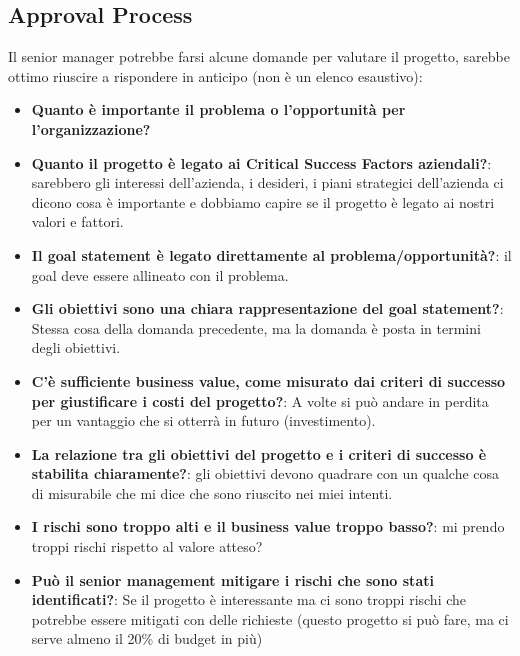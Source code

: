\subsection{Approval Process}
Il senior manager potrebbe farsi alcune domande per valutare il progetto, sarebbe ottimo riuscire a rispondere in anticipo (non è un elenco esaustivo):
\begin{itemize}
	\item \textbf{Quanto è importante il problema o l'opportunità per l'organizzazione?}
	\item \textbf{Quanto il progetto è legato ai Critical Success Factors aziendali?}: sarebbero gli interessi dell'azienda, i desideri, i piani strategici dell'azienda ci dicono cosa è importante e dobbiamo capire se il progetto è legato ai nostri valori e fattori.
	\item \textbf{Il goal statement è legato direttamente al problema/opportunità?}: il goal deve essere allineato con il problema.
	\item \textbf{Gli obiettivi sono una chiara rappresentazione del goal statement?}: Stessa cosa della domanda precedente, ma la domanda è posta in termini degli obiettivi.
	\item \textbf{C'è sufficiente business value, come misurato dai criteri di successo per giustificare i costi del progetto?}: A volte si può andare in perdita per un vantaggio che si otterrà in futuro (investimento).
	\item \textbf{La relazione tra gli obiettivi del progetto e i criteri di successo è stabilita chiaramente?}: gli obiettivi devono quadrare con un qualche cosa di misurabile che mi dice che sono riuscito nei miei intenti.
	\item \textbf{I rischi sono troppo alti e il business value troppo basso?}: mi prendo troppi rischi rispetto al valore atteso?
	\item \textbf{Può il senior management mitigare i rischi che sono stati identificati?}: Se il progetto è interessante ma ci sono troppi rischi che potrebbe essere mitigati con delle richieste (questo progetto si può fare, ma ci serve almeno il 20\% di budget in più)
\end{itemize}
